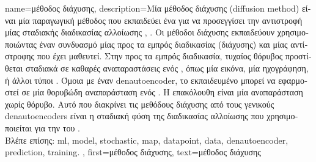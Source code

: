{name={\foreignlanguage{greek}{μέθοδος διάχυσης}},
	description={\foreignlanguage{greek}{Μία μέθοδος διάχυσης} (diffusion method) 
		\foreignlanguage{greek}{είναι μία παραγωγική μέθοδος}  \foreignlanguage{greek}{που εκπαιδεύει ένα}  
		\foreignlanguage{greek}{για να προσεγγίσει την αντιστροφή μίας σταδιακής}  \foreignlanguage{greek}{διαδικασίας 
		αλλοίωσης} \cite{BishopDeepLearning}, \cite{Prince2023UnderstandingDL}. 
		\foreignlanguage{greek}{Οι μέθοδοι διάχυσης εκπαιδεύουν}  \foreignlanguage{greek}{χρησιμοποιώντας έναν 
		συνδυασμό μίας προς τα εμπρός διαδικασίας (διάχυσης) και μίας αντίστροφης}  \foreignlanguage{greek}{που έχει μαθευτεί. 
		Στην προς τα εμπρός διαδικασία, τυχαίος θόρυβος προστίθεται σταδιακά σε καθαρές αναπαραστάσεις ενός} , 
		\foreignlanguage{greek}{όπως μία εικόνα, μία ηχογράφηση, ή άλλοι τύποι} . \foreignlanguage{greek}{Όμοια με έναν}
		\gls{denautoencoder}, \foreignlanguage{greek}{το εκπαιδευμένο}  \foreignlanguage{greek}{μπορεί να εφαρμοστεί 
		σε μία θορυβώδη αναπαράσταση ενός} . \foreignlanguage{greek}{Η επακόλουθη}  
		\foreignlanguage{greek}{είναι μία αναπαράσταση χωρίς θόρυβο. Αυτό που διακρίνει τις μεθόδους διάχυσης από τους γενικούς} 
		\glspl{denautoencoder} \foreignlanguage{greek}{είναι η σταδιακή φύση της διαδικασίας αλλοίωσης που χρησιμοποιείται για την} 
		 \foreignlanguage{greek}{του} .
		\\
		\foreignlanguage{greek}{Βλέπε επίσης:} \gls{ml}, \gls{model}, \gls{stochastic}, \gls{map}, \gls{datapoint}, \gls{data}, \gls{denautoencoder}, 
		\gls{prediction}, \gls{training}. },
	first={\foreignlanguage{greek}{μέθοδος διάχυσης}},
    	text={\foreignlanguage{greek}{μέθοδος διάχυσης}}
}

